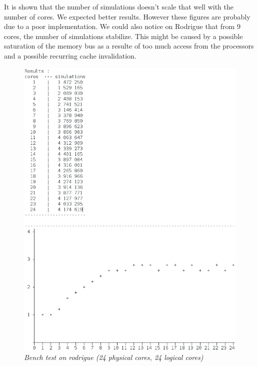 It is shown that the number of simulations doesn't scale that well with the number of cores. We expected better results. However these figures are probably due to a poor implementation.
We could also notice on Rodrigue that from 9 cores, the number of simulations stabilize. This might be caused by a possible  saturation of the memory bus as a resulte of too much access from the processors and a possible recurring cache invalidation.

\begin{figure}[H] 
\centerline{\includegraphics[width=\textwidth]{Optimisations/bench_rodrigue.png}}
\caption{\label{fig:Defrag}\textit{Bench test on rodrigue (24 physical cores, 24 logical cores)}}
\end{figure}


